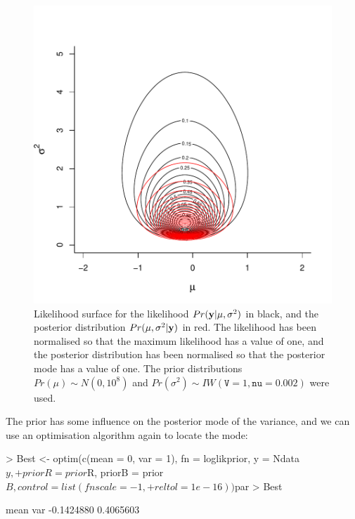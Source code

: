 \documentclass{article}
\begin{document}
\begin{figure}[!h]
\begin{center}
\includegraphics{Lecture1-034}
\end{center}
\caption{Likelihood surface for the likelihood $Pr({\bf y}|\mu, \sigma^{2})$ in black, and the posterior distribution $Pr(\mu, \sigma^{2} | {\bf y})$ in red.  The likelihood has been normalised so that the maximum likelihood has a value of one, and the posterior distribution has been normalised so that the posterior mode has a value of one. The prior distributions  $Pr(\mu)\sim N(0, 10^8)$ and  $Pr(\sigma^{2})\sim IW(\texttt{V}=1, \texttt{nu}=0.002)$ were used.}
\label{Psurface-fig}
\end{figure}


The prior has some influence on the posterior mode of the variance, and we can use an optimisation algorithm again to locate the mode:  

\begin{Schunk}
\begin{Sinput}
> Best <- optim(c(mean = 0, var = 1), fn = loglikprior, y = Ndata$y, 
+     priorR = prior$R, priorB = prior$B, control = list(fnscale = -1, 
+         reltol = 1e-16))$par
> Best
\end{Sinput}
\begin{Soutput}
      mean        var 
-0.1424880  0.4065603 
\end{Soutput}
\end{Schunk}
\end{document}
